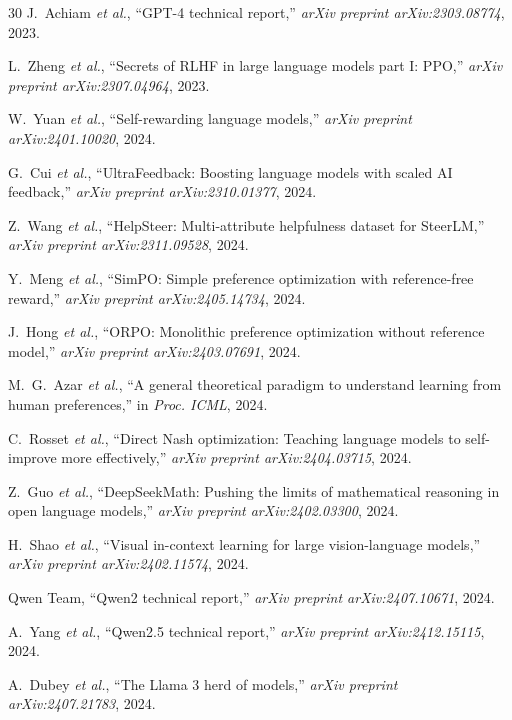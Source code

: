 \documentclass[10pt,twocolumn]{article}
\begin{document}
\begin{thebibliography}{30}
J.~Achiam \textit{et al.}, ``GPT-4 technical report,'' \textit{arXiv preprint arXiv:2303.08774}, 2023.

L.~Zheng \textit{et al.}, ``Secrets of RLHF in large language models part I: PPO,'' \textit{arXiv preprint arXiv:2307.04964}, 2023.

W.~Yuan \textit{et al.}, ``Self-rewarding language models,'' \textit{arXiv preprint arXiv:2401.10020}, 2024.

G.~Cui \textit{et al.}, ``UltraFeedback: Boosting language models with scaled AI feedback,'' \textit{arXiv preprint arXiv:2310.01377}, 2024.

Z.~Wang \textit{et al.}, ``HelpSteer: Multi-attribute helpfulness dataset for SteerLM,'' \textit{arXiv preprint arXiv:2311.09528}, 2024.

Y.~Meng \textit{et al.}, ``SimPO: Simple preference optimization with reference-free reward,'' \textit{arXiv preprint arXiv:2405.14734}, 2024.

J.~Hong \textit{et al.}, ``ORPO: Monolithic preference optimization without reference model,'' \textit{arXiv preprint arXiv:2403.07691}, 2024.

M.~G.~Azar \textit{et al.}, ``A general theoretical paradigm to understand learning from human preferences,'' in \textit{Proc. ICML}, 2024.

C.~Rosset \textit{et al.}, ``Direct Nash optimization: Teaching language models to self-improve more effectively,'' \textit{arXiv preprint arXiv:2404.03715}, 2024.

Z.~Guo \textit{et al.}, ``DeepSeekMath: Pushing the limits of mathematical reasoning in open language models,'' \textit{arXiv preprint arXiv:2402.03300}, 2024.

H.~Shao \textit{et al.}, ``Visual in-context learning for large vision-language models,'' \textit{arXiv preprint arXiv:2402.11574}, 2024.

Qwen Team, ``Qwen2 technical report,'' \textit{arXiv preprint arXiv:2407.10671}, 2024.

A.~Yang \textit{et al.}, ``Qwen2.5 technical report,'' \textit{arXiv preprint arXiv:2412.15115}, 2024.

A.~Dubey \textit{et al.}, ``The Llama 3 herd of models,'' \textit{arXiv preprint arXiv:2407.21783}, 2024.


\end{thebibliography}
\end{document}
